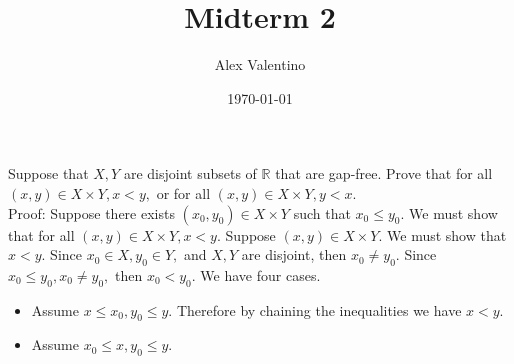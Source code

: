 \documentclass[12pt, letterpaper]{article}
\date{\today}
\author{Alex Valentino}
\title{Midterm 2}
\newcommand{\R}{\mathbb{R}}
\begin{document}
	Suppose that $X,Y$ are disjoint subsets of $\R$ that are gap-free.  Prove that for all $(x,y) \in X \times Y, x <y,$ or for all $(x,y) \in X \times Y, y < x$.\\
	
	Proof: Suppose there exists $(x_0, y_0) \in X \times Y$ such that $x_0 \leq y_0.$  We must show that for all $(x,y) \in X \times Y, x < y.$  Suppose $(x,y) \in X \times Y.$  We must show that $x < y.$ Since $x_0 \in X, y_0 \in Y,$ and $X,Y$ are disjoint, then $x_0 \neq y_0.$  Since $x_0 \leq y_0, x_0 \neq y_0, $ then $x_0 < y_0.$  We have four cases.  \begin{itemize}
		\item Assume $x \leq x_0, y_0 \leq y.$  Therefore by chaining the inequalities we have $x < y.$
		\item Assume $x_0 \leq x, y_0 \leq y.$  
	\end{itemize}
\end{document}
